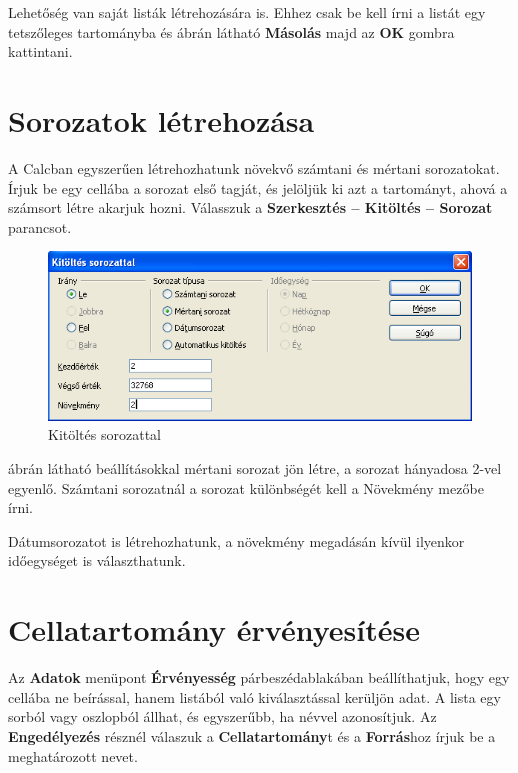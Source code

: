 Lehetőség van saját listák létrehozására is. Ehhez csak
be kell írni a listát egy tetszőleges tartományba és 
ábrán látható \textbf{Másolás} majd az \textbf{OK} gombra
kattintani. 


\section{Sorozatok létrehozása}

A Calcban egyszerűen létrehozhatunk növekvő számtani és
mértani sorozatokat. Írjuk be egy cellába a sorozat első
tagját, és jelöljük ki azt a tartományt, ahová a számsort
létre akarjuk hozni. Válasszuk a \textbf{Szerkesztés --
Kitöltés --  Sorozat} parancsot. 

\begin{figure}[!h]
\begin{center}
\includegraphics[width=12.081cm]{oocalcv2-img109.png}
\caption{Kitöltés sorozattal}\label{KitöltésSorozattal}
\end{center}
\end{figure}

 ábrán látható beállításokkal mértani sorozat
jön létre, a sorozat hányadosa 2-vel egyenlő. Számtani
sorozatnál a sorozat különbségét kell a Növekmény mezőbe írni.

Dátumsorozatot is létrehozhatunk, a növekmény megadásán
kívül ilyenkor időegységet is választhatunk.


\section{Cellatartomány érvényesítése}

Az \textbf{Adatok} menüpont \textbf{Érvényesség}
párbeszédablakában beállíthatjuk, hogy egy cellába ne
beírással, hanem listából való kiválasztással
kerüljön adat. A lista egy sorból vagy oszlopból állhat, és
egyszerűbb, ha névvel azonosítjuk. Az \textbf{Engedélyezés}
résznél válaszuk a \textbf{Cellatartomány}t és a
\textbf{Forrás}hoz írjuk be a meghatározott nevet.


